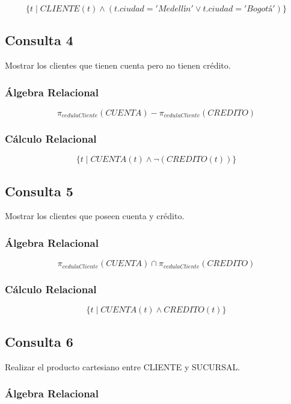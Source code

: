 \documentclass[stu,12pt,floatsintext]{apa7}
\begin{document}
\[
\{t \mid CLIENTE(t)
\land
(t.ciudad='Medellín'
\lor
t.ciudad='Bogotá')
\}
\]


\subsection{Consulta 4}
Mostrar los clientes que tienen cuenta pero no tienen crédito.

\subsubsection{Álgebra Relacional}

\[
\pi_{cedulaCliente}(CUENTA)
-
\pi_{cedulaCliente}(CREDITO)
\]

\subsubsection{Cálculo Relacional}

\[
\{t \mid CUENTA(t)
\land
\neg(CREDITO(t))
\}
\]


\subsection{Consulta 5}
Mostrar los clientes que poseen cuenta y crédito.

\subsubsection{Álgebra Relacional}

\[
\pi_{cedulaCliente}(CUENTA)
\cap
\pi_{cedulaCliente}(CREDITO)
\]

\subsubsection{Cálculo Relacional}

\[
\{t \mid CUENTA(t)
\land
CREDITO(t)
\}
\]


\subsection{Consulta 6}
Realizar el producto cartesiano entre CLIENTE y SUCURSAL.

\subsubsection{Álgebra Relacional}
\end{document}
